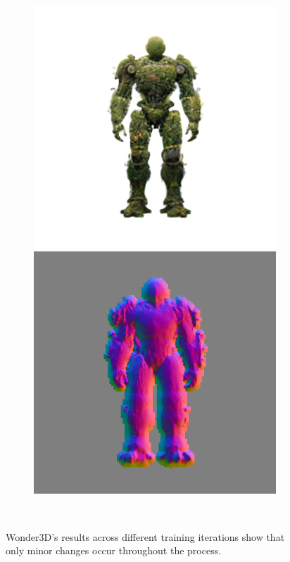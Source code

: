 \begin{figure}[H]
\begin{subfigure}[b]{0.18\textwidth}
        \caption{}
    \end{subfigure}
    \begin{subfigure}[b]{0.18\textwidth}
        \centering
        \fontsize{9pt}{7pt}\selectfont{}
        \includegraphics[width=\textwidth]{etc/a robot made out of plants/wonder3d/test/wonder3D_10000_front_part1}
        \includegraphics[width=\textwidth]{etc/a robot made out of plants/wonder3d/test/wonder3D_10000_front_part4}
        \caption{}
    \end{subfigure}
    \caption{Wonder3D's results across different training iterations show that only minor changes occur throughout the process.}~\label{fig:generationWonder3D}
  \end{figure}